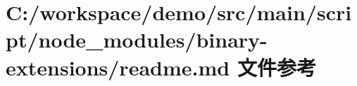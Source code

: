 \hypertarget{node__modules_2binary-extensions_2_r_e_a_d_m_e_8md}{}\section{C\+:/workspace/demo/src/main/script/node\+\_\+modules/binary-\/extensions/readme.md 文件参考}
\label{node__modules_2binary-extensions_2_r_e_a_d_m_e_8md}
